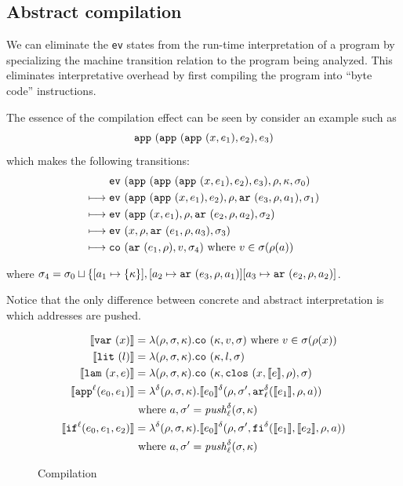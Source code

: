 \documentclass[preprint,onecolumn,9pt]{sigplanconf} %
\begin{document}
\subsection{Abstract compilation}

We can eliminate the {\tt ev} states from the run-time interpretation
of a program by specializing the machine transition relation to the
program being analyzed. This eliminates interpretative overhead by
first compiling the program into ``byte code'' instructions.

The essence of the compilation effect can be seen by consider an example
such as
\[
\sapp{\sapp{\sapp\mvar{\mexp_1}}{\mexp_2}}{\mexp_3}
\]
which makes the following transitions:
\begin{align}
& \ev{\sapp{\sapp{\sapp\mvar{\mexp_1}}{\mexp_2}}{\mexp_3},\menv,\mkont,\msto_0}\\
\machstep\; &
\ev{\sapp{\sapp\mvar{\mexp_1}}{\mexp_2},\menv,\kar{\mexp_3,\menv,\maddr_1},\msto_1}
\\
\machstep\; &
\ev{\sapp\mvar{\mexp_1},\menv,\kar{\mexp_2,\menv,\maddr_2},\msto_2}
\\
\machstep\; &
\ev{\mvar, \menv,\kar{\mexp_1,\menv,\maddr_3},\msto_3} %
\\
\machstep\; &
\co{\kar{\mexp_1,\menv},\mval,\msto_4} %
\mbox{ where } \mval \in \msto(\menv(\maddr))
\end{align}

where $\msto_4 = \msto_0 \sqcup \{ [\maddr_1 \mapsto \{ \mkont \}],
[\maddr_2 \mapsto \kar{\mexp_3,\menv,\maddr_1}]
[\maddr_3 \mapsto \kar{\mexp_2,\menv,\maddr_2}]$.


Notice that the only difference between concrete and abstract interpretation
is which addresses are pushed.

\begin{figure}
\begin{align*}
\compile{\svar\mvar} &= \lambda(\menv,\msto,\mkont) .\co{\mkont,\mval,\msto} \text{ where }\mval\in\msto(\menv(\mvar))
\\
\compile{\slit\mlit} &= \lambda(\menv,\msto,\mkont) .
\co{\mkont,\mlit,\msto}
\\
\compile{\slam\mvar\mexp} &= \lambda(\menv,\msto,\mkont) .
\co{\mkont,\clos{\mvar,\compile\mexp,\menv},\msto}
\\
\compile{\sapp[^\mlab]{\mexpi0}{\mexpi1}} &= \lambda^\mcntr(\menv,\msto,\mkont) .
\compile{\mexpi0}^\mcntr(\menv,\msto',\kar[_\mlab^\mcntr]{\compile{\mexpi1},\menv,\maddr})
\\
&
\text{ where }\maddr,\msto' = \mathit{push}^\mcntr_\mlab(\msto,\mkont)
\\
\compile{\sif[^\mlab]{\mexpi0}{\mexpi1}{\mexpi2}} &= \lambda^\mcntr(\menv,\msto,\mkont) .
\compile{\mexpi0}^\delta(\menv,\msto',\kif[^\mcntr]{\compile{\mexpi1},\compile{\mexpi2},\menv,\maddr})
\\
&\text{ where }\maddr,\msto' = \mathit{push}_\mlab^\mcntr(\msto,\mkont)
\end{align*}
\caption{Compilation}
\end{figure}
\end{document}
